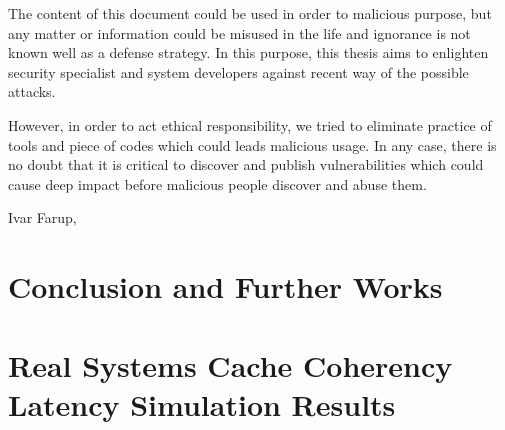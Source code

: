 \documentclass[medieteknikk]{gucmasterthesis}
\begin{document}
The content of this document could be used in order to malicious purpose, but any matter or information could be misused in the life and ignorance is not known well as a defense strategy. In this purpose, this thesis aims to enlighten security specialist and system developers against recent way of the possible attacks. 

However, in order to act ethical responsibility, we tried to eliminate practice of tools and piece of codes which could leads malicious usage. In any case, there is no doubt that it is critical to discover and publish vulnerabilities which could cause deep impact before malicious people discover and abuse them.


\vspace{\baselineskip}
\noindent Ivar Farup, \gucmasterthesisdate

\tableofcontents
\listoffigures
\listoftables







\chapter{Conclusion and Further Works}




\appendix

\chapter{Real Systems Cache Coherency Latency Simulation Results}


\end{document}
